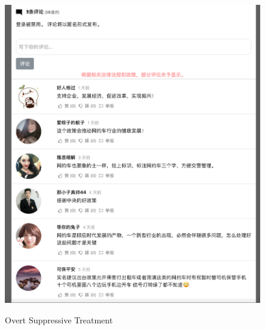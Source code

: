 \documentclass[11pt]{article}
\begin{document}
\begin{figure}
  \centering
  \caption{Overt Suppressive Treatment}
  \vspace{1em}
  \includegraphics[width=\textwidth]{figures/overt_subtractive.png}
  \label{overt_subtractive}
\end{figure}
\end{document}
